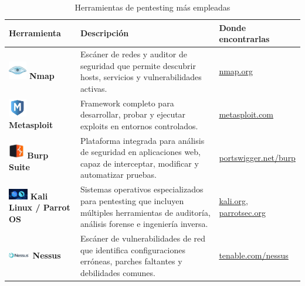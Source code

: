 \documentclass[a4paper, 10pt]{article}
\begin{document}
    \begin{table}[H]
    \caption{Herramientas de pentesting más empleadas}
    \centering
    \begin{tabular}{|m{5cm}|m{8cm}|m{3.5cm}|}
        \hline
        \textbf{Herramienta} & \textbf{Descripción} & \textbf{Donde encontrarlas} \\
        \hline
        \includegraphics[width=0.8cm]{images/nmap.jpeg} \textbf{Nmap} & Escáner de redes y auditor de seguridad que permite descubrir hosts, servicios y vulnerabilidades activas. & \href{https://nmap.org}{nmap.org} \\
        \hline
        \includegraphics[width=0.8cm]{images/metasploit.jpeg} \textbf{Metasploit} & Framework completo para desarrollar, probar y ejecutar exploits en entornos controlados. & \href{https://www.metasploit.com}{metasploit.com} \\
        \hline
        \includegraphics[width=0.7cm]{images/burp.jpeg} \textbf{Burp Suite} & Plataforma integrada para análisis de seguridad en aplicaciones web, capaz de interceptar, modificar y automatizar pruebas. & \href{https://portswigger.net/burp}{portswigger.net/burp} \\
        \hline
        \includegraphics[width=0.85cm]{images/kali.jpeg} \textbf{Kali Linux / Parrot OS} & Sistemas operativos especializados para pentesting que incluyen múltiples herramientas de auditoría, análisis forense e ingeniería inversa. & \href{https://www.kali.org}{kali.org}, \href{https://www.parrotsec.org}{parrotsec.org} \\
        \hline
        \includegraphics[width=0.95cm]{images/nessus.png} \textbf{Nessus} & Escáner de vulnerabilidades de red que identifica configuraciones erróneas, parches faltantes y debilidades comunes. & \href{https://www.tenable.com/products/nessus}{tenable.com/nessus} \\

\end{tabular}
\end{table}
\end{document}
